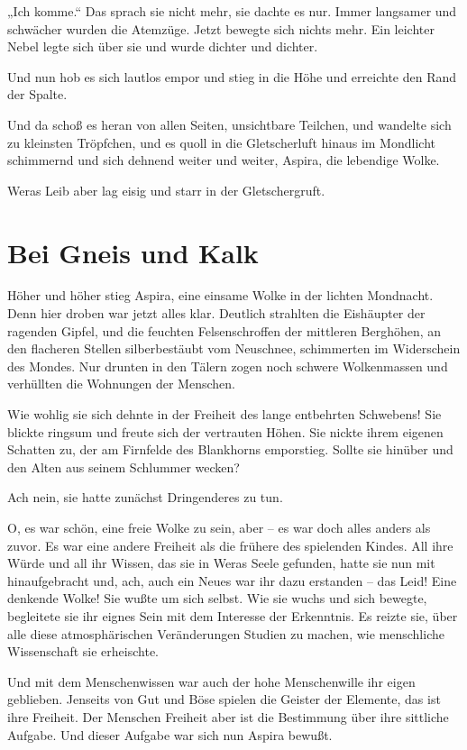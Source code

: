 „Ich komme.“ Das sprach sie nicht mehr, sie dachte es nur. Immer
langsamer und schwächer wurden die Atemzüge. Jetzt bewegte sich
nichts mehr. Ein leichter Nebel legte sich über sie und wurde
dichter und dichter.

Und nun hob es sich lautlos empor und stieg in die Höhe und
erreichte den Rand der Spalte.

Und da schoß es heran von allen Seiten, unsichtbare Teilchen, und
wandelte sich zu kleinsten Tröpfchen, und es quoll in die
Gletscherluft hinaus im Mondlicht schimmernd und sich dehnend
weiter und weiter, Aspira, die lebendige Wolke.

Weras Leib aber lag eisig und starr in der Gletschergruft.

\section{Bei Gneis und Kalk}

Höher und höher stieg Aspira, eine einsame Wolke in der lichten
Mondnacht. Denn hier droben war jetzt alles klar. Deutlich
strahlten die Eishäupter der ragenden Gipfel, und die feuchten
Felsenschroffen der mittleren Berghöhen, an den flacheren Stellen
silberbestäubt vom Neuschnee, schimmerten im Widerschein des
Mondes. Nur drunten in den Tälern zogen noch schwere Wolkenmassen
und verhüllten die Wohnungen der Menschen.

Wie wohlig sie sich dehnte in der Freiheit des lange entbehrten
Schwebens! Sie blickte ringsum und freute sich der vertrauten
Höhen. Sie nickte ihrem eigenen Schatten zu, der am Firnfelde des
Blankhorns emporstieg. Sollte sie hinüber und den Alten aus seinem
Schlummer wecken?

Ach nein, sie hatte zunächst Dringenderes zu tun.

O, es war schön, eine freie Wolke zu sein, aber – es war doch alles
anders als zuvor. Es war eine andere Freiheit als die frühere des
spielenden Kindes. All ihre Würde und all ihr Wissen, das sie in
Weras Seele gefunden, hatte sie nun mit hinaufgebracht und, ach,
auch ein Neues war ihr dazu erstanden – das Leid! Eine denkende
Wolke! Sie wußte um sich selbst. Wie sie wuchs und sich bewegte,
begleitete sie ihr eignes Sein mit dem Interesse der Erkenntnis. Es
reizte sie, über alle diese atmosphärischen Veränderungen Studien
zu machen, wie menschliche Wissenschaft sie erheischte.

Und mit dem Menschenwissen war auch der hohe Menschenwille ihr
eigen geblieben. Jenseits von Gut und Böse spielen die Geister der
Elemente, das ist ihre Freiheit. Der Menschen Freiheit aber ist die
Bestimmung über ihre sittliche Aufgabe. Und dieser Aufgabe war sich
nun Aspira bewußt.


